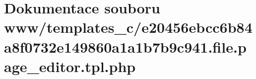 \section{Dokumentace souboru www/templates\_\-c/e20456ebcc6b84a8f0732e149860a1a1b7b9c941.file.page\_\-editor.tpl.php}
\label{d5/d3c/e20456ebcc6b84a8f0732e149860a1a1b7b9c941_8file_8page__editor_8tpl_8php}
